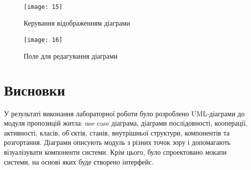 \documentclass[oneside,14pt]{extarticle}
\begin{document}
\begin{normalsize}
	\begin{figure}[H]
		\centering
		\texttt{[image: 15]}
		\caption{Керування відображенням діаграми}
	\end{figure}
	
	\begin{figure}[H]
		\centering
		\texttt{[image: 16]}
		\caption{Поле для редагування діаграми}
	\end{figure}
	
	\section*{Висновки}
	У результаті виконання лабораторної роботи було розроблено UML-діаграми до модуля пропозицій житла: use case діаграма, діаграми послідовності, кооперації, активності, класів, об’єктів, станів, внутрішньої структури, компонентів та розгортання. Діаграми описують модуль з різних точок зору і допомагають візуалізувати компоненти системи. Крім цього, було спроектовано мокапи системи, на основі яких буде створено інтерфейс.
	    
\end{normalsize}
\end{document}

